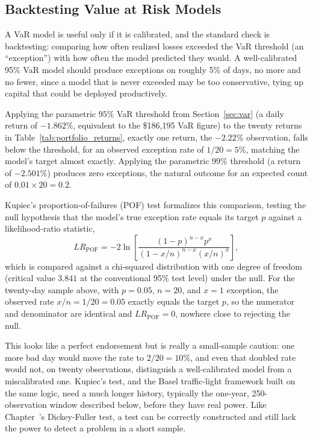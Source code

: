 \documentclass[../ai_in_finance]{subfiles}
\begin{document}
\subsection{Backtesting Value at Risk Models}
\label{sec:backtesting-var}

A VaR model is useful only if it is calibrated, and the standard check is backtesting: comparing how often realized losses exceeded the VaR threshold (an ``exception'') with how often the model predicted they would. A well-calibrated 95\% VaR model should produce exceptions on roughly 5\% of days, no more and no fewer, since a model that is never exceeded may be too conservative, tying up capital that could be deployed productively.

Applying the parametric $95\%$ VaR threshold from Section~\ref{sec:var} (a daily return of $-1.862\%$, equivalent to the \$186,195 VaR figure) to the twenty returns in Table~\ref{tab:portfolio_returns}, exactly one return, the $-2.22\%$ observation, falls below the threshold, for an observed exception rate of $1/20 = 5\%$, matching the model's target almost exactly. Applying the parametric $99\%$ threshold (a return of $-2.501\%$) produces zero exceptions, the natural outcome for an expected count of $0.01 \times 20 = 0.2$.

Kupiec's proportion-of-failures (POF) test formalizes this comparison, testing the null hypothesis that the model's true exception rate equals its target $p$ against a likelihood-ratio statistic,
\begin{equation}
\label{eq:marketrisk-kupiec}
LR_{\text{POF}} = -2\ln\left[\frac{(1-p)^{n-x}p^x}{(1-x/n)^{n-x}(x/n)^x}\right],
\end{equation}
which is compared against a chi-squared distribution with one degree of freedom (critical value $3.841$ at the conventional 95\% test level) under the null. For the twenty-day sample above, with $p=0.05$, $n=20$, and $x=1$ exception, the observed rate $x/n=1/20=0.05$ exactly equals the target $p$, so the numerator and denominator are identical and $LR_{\text{POF}}=0$, nowhere close to rejecting the null.

This looks like a perfect endorsement but is really a small-sample caution: one more bad day would move the rate to $2/20=10\%$, and even that doubled rate would not, on twenty observations, distinguish a well-calibrated model from a miscalibrated one. Kupiec's test, and the Basel traffic-light framework built on the same logic, need a much longer history, typically the one-year, 250-observation window described below, before they have real power. Like Chapter~'s Dickey-Fuller test, a test can be correctly constructed and still lack the power to detect a problem in a short sample.
\end{document}
